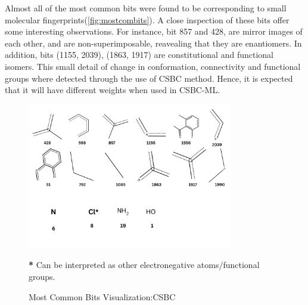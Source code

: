 Almost all of the most common bits were found to be corresponding to small molecular fingerprints(\autoref{fig:mostcombits}). A close inspection of these bits offer some interesting observations. For instance, bit 857 and 428, are mirror images of each other, and are non-superimposable, reavealing that they are enantiomers. In addition, bits (1155, 2039), (1863, 1917) are constitutional and functional isomers. This small detail of change in conformation, connectivity and functional groups where detected through the use of CSBC method. Hence, it is expected that it will have different weights when used in CSBC-ML. 
\begin{figure}[h]
	\centering
	\begin{minipage}{\textwidth}
		\centering
		\includegraphics[width=0.8\textwidth]{mostcommonbitv2.png}
		\vspace{-0.3cm}
		
		\parbox{\textwidth}{\centering \footnotesize \textbf{*} Can be interpreted as other electronegative atoms/functional groups.}
		
		\vspace{0.3cm}
		\caption{Most Common Bits Visualization:CSBC}
		\label{fig:mostcombits}
	\end{minipage}
\end{figure}
\FloatBarrier

